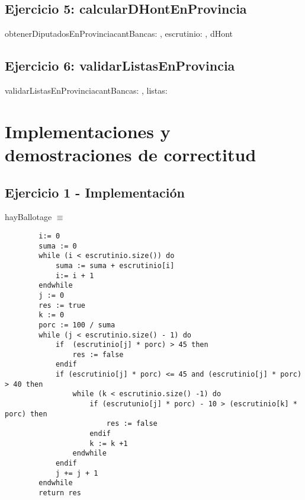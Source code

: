 \documentclass[10pt,a4paper]{article}
\begin{document}
\subsection{Ejercicio 5: \textmd{calcularDHontEnProvincia}}
	\begin{proc}{obtenerDiputadosEnProvincia}{\In cantBancas: \ent, \In escrutinio: \ent, \In dHont \matriz{\ent}}{\TLista{\ent}}{
	}
	\end{proc}

	\subsection{Ejercicio 6: \textmd{validarListasEnProvincia}}
	\begin{proc}{validarListasEnProvincia}{\In cantBancas: \ent, \In listas: }{\bool}
	\end{proc}
	

\section{Implementaciones y demostraciones de correctitud}
\subsection{Ejercicio 1 - Implementación}
\begin{minipage}[t]{\textwidth}
	hayBallotage \(\equiv\) \begin{lstlisting}
		i:= 0
		suma := 0
		while (i < escrutinio.size()) do
			suma := suma + escrutinio[i]
			i:= i + 1
		endwhile
		j := 0
		res := true
		k := 0
		porc := 100 / suma
		while (j < escrutinio.size() - 1) do 
			if  (escrutinio[j] * porc) > 45 then
				res := false
			endif
			if (escrutinio[j] * porc) <= 45 and (escrutinio[j] * porc) > 40 then
				while (k < escrutinio.size() -1) do
					if (escrutunio[j] * porc) - 10 > (escrutinio[k] * porc) then
						res := false
					endif
					k := k +1
				endwhile
			endif
			j += j + 1
		endwhile
		return res
	\end{lstlisting}
\end{minipage}		
\end{document}
